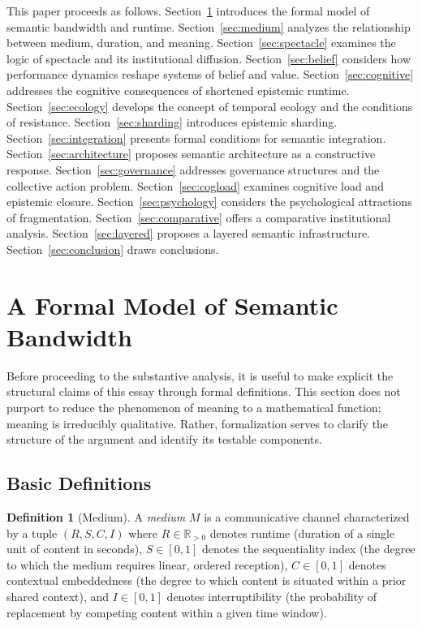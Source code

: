 \documentclass[12pt]{article}
\theoremstyle{definition}
\newtheorem{definition}{Definition}[section]
\theoremstyle{plain}
\begin{document}
This paper proceeds as follows. Section~\ref{sec:formal} introduces the formal model of semantic bandwidth and runtime. Section~\ref{sec:medium} analyzes the relationship between medium, duration, and meaning. Section~\ref{sec:spectacle} examines the logic of spectacle and its institutional diffusion. Section~\ref{sec:belief} considers how performance dynamics reshape systems of belief and value. Section~\ref{sec:cognitive} addresses the cognitive consequences of shortened epistemic runtime. Section~\ref{sec:ecology} develops the concept of temporal ecology and the conditions of resistance. Section~\ref{sec:sharding} introduces epistemic sharding. Section~\ref{sec:integration} presents formal conditions for semantic integration. Section~\ref{sec:architecture} proposes semantic architecture as a constructive response. Section~\ref{sec:governance} addresses governance structures and the collective action problem. Section~\ref{sec:cogload} examines cognitive load and epistemic closure. Section~\ref{sec:psychology} considers the psychological attractions of fragmentation. Section~\ref{sec:comparative} offers a comparative institutional analysis. Section~\ref{sec:layered} proposes a layered semantic infrastructure. Section~\ref{sec:conclusion} draws conclusions.

\section{A Formal Model of Semantic Bandwidth}
\label{sec:formal}

Before proceeding to the substantive analysis, it is useful to make explicit the structural claims of this essay through formal definitions. This section does not purport to reduce the phenomenon of meaning to a mathematical function; meaning is irreducibly qualitative. Rather, formalization serves to clarify the structure of the argument and identify its testable components.

\subsection{Basic Definitions}

\begin{definition}[Medium]
A \emph{medium} $M$ is a communicative channel characterized by a tuple $(R, S, C, I)$ where $R \in \mathbb{R}_{>0}$ denotes runtime (duration of a single unit of content in seconds), $S \in [0,1]$ denotes the sequentiality index (the degree to which the medium requires linear, ordered reception), $C \in [0,1]$ denotes contextual embeddedness (the degree to which content is situated within a prior shared context), and $I \in [0,1]$ denotes interruptibility (the probability of replacement by competing content within a given time window).
\end{definition}
\end{document}
